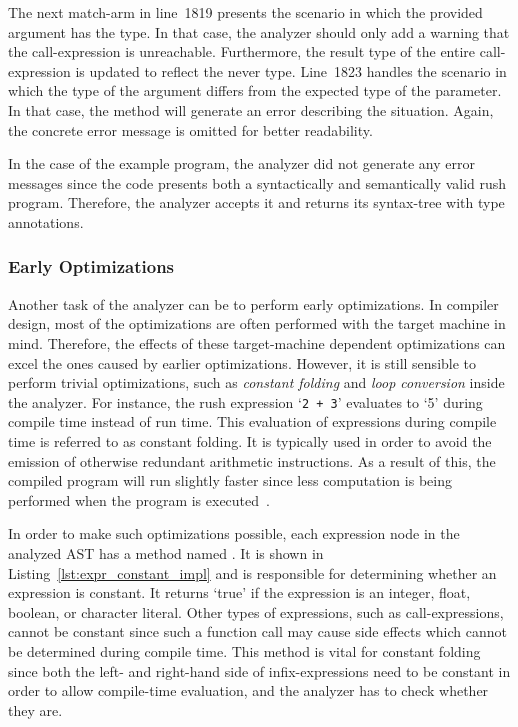 The next match-arm in line~1819 presents the scenario in which the provided argument has the  type.
In that case, the analyzer should only add a warning that the call-expression is unreachable.
Furthermore, the result type of the entire call-expression is updated to reflect the never type.
Line~1823 handles the scenario in which the type of the argument differs from the expected type of the parameter.
In that case, the method will generate an error describing the situation.
Again, the concrete error message is omitted for better readability.

In the case of the example program, the analyzer did not generate any error messages since the code presents both a syntactically and semantically valid rush program.
Therefore, the analyzer accepts it and returns its syntax-tree with type annotations.

\subsubsection{Early Optimizations}

Another task of the analyzer can be to perform early optimizations.
In compiler design, most of the optimizations are often performed with the target machine in mind.
Therefore, the effects of these target-machine dependent optimizations can excel the ones caused by earlier optimizations.
However, it is still sensible to perform trivial optimizations, such as \emph{constant folding} and \emph{loop conversion} inside the analyzer.
For instance, the rush expression `\texttt{2~+~3}' evaluates to `5' during compile time instead of run time.
This evaluation of expressions during compile time is referred to as constant folding.
It is typically used in order to avoid the emission of otherwise redundant arithmetic instructions.
As a result of this, the compiled program will run slightly faster since less computation is being performed when the program is executed~\cite[p.~54]{wirth_compiler_construction_2005}.



In order to make such optimizations possible, each expression node in the analyzed AST has a method named .
It is shown in Listing~\ref{lst:expr_constant_impl} and is responsible for determining whether an expression is constant.
It returns `true' if the expression is an integer, float, boolean, or character literal.
Other types of expressions, such as call-expressions, cannot be constant since such a function call may cause side effects which cannot be determined during compile time.
This method is vital for constant folding since both the left- and right-hand side of infix-expressions need to be constant in order to allow compile-time evaluation, and the analyzer has to check whether they are.

